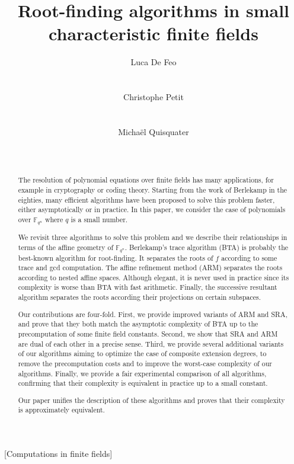 \documentclass{sig-alternate}
\author{
  \alignauthor Luca De Feo\\
  \affaddr{Laboratoire PRiSM}\\
  \affaddr{Universit\'e de Versailles}\\
  \email{luca.de-feo@uvsq.fr}
  \alignauthor Christophe Petit\\
  \affaddr{Information Security Group}\\
  \affaddr{University College London}\\
  \email{}
  \alignauthor Micha\"el Quisquater\\
  \affaddr{Laboratoire PRiSM}\\
  \affaddr{Universit\'e de Versailles}\\
  \email{mquis@prism.uvsq.fr}
}
\title{Root-finding algorithms in small characteristic finite fields}
\newcommand{\ff}[1]{\mathbb{F}_{#1}}
\newcommand{\fqn}{\ff{q^n}}
\newcommand{\qq}{q}
\newcounter{algo}
\begin{document}
\maketitle
\begin{abstract}
  The resolution of polynomial equations over finite fields has many
  applications, for example in cryptography or coding theory. Starting
  from the work of Berlekamp in the eighties, many efficient
  algorithms have been proposed to solve this problem faster, either
  asymptotically or in practice.  In this paper, we consider the case
  of polynomials over $\fqn$ where $\qq$ is a small number. 
  
  We revisit three algorithms to solve this problem and we describe their relationships in terms of the affine geometry of $\fqn$.
Berlekamp's trace algorithm (BTA) is probably the best-known algorithm for root-finding. It separates the roots of $f$ according to some trace and gcd computation. The affine refinement method (ARM) separates the roots according to nested affine spaces. Although elegant, it is never used in practice since its complexity is worse than BTA with fast arithmetic. Finally, the successive resultant algorithm separates the roots according their projections on certain subspaces.

Our contributions are four-fold. First, we provide improved variants of ARM and SRA, and prove that they both match the asymptotic complexity of BTA up to the precomputation of some finite field constants.
 Second, we show that SRA and ARM are dual of each other in a precise sense.
 Third, we provide several additional variants of our algorithms aiming to optimize the case of composite extension degrees, to remove the precomputation costs and to improve the worst-case complexity of our algorithms.
 Finally, we provide a fair experimental comparison of all algorithms, confirming that their complexity is equivalent in practice up to  a small constant.
 
 Our paper unifies the description of these algorithms and proves that their complexity is approximately equivalent.
\end{abstract}

[Computations in finite fields]

\end{document}
